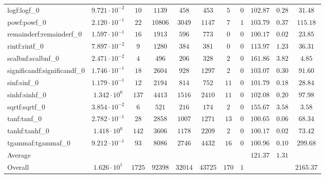 \begin{tabular}{|l|c|c|c|c|c|c|c|c|c|c|}
logf:logf\_0                 & $ 9.721 \cdot 10^{-2} $ & $ 10     $ & $ 1139  $ & $ 458   $ & $ 453   $ & $ 5   $ & $ 0 $ & $ 102.87      $ & $ 0.28    $ & $ 31.48   $ \\
powf:powf\_0                 & $ 2.120 \cdot 10^{-1} $ & $ 22     $ & $ 10806 $ & $ 3049  $ & $ 1147  $ & $ 7   $ & $ 1 $ & $ 103.79      $ & $ 0.37    $ & $ 115.18  $ \\
remainderf:remainderf\_0     & $ 1.597 \cdot 10^{-1} $ & $ 16     $ & $ 1913  $ & $ 596   $ & $ 773   $ & $ 0   $ & $ 0 $ & $ 100.17      $ & $ 0.02    $ & $ 23.85   $ \\
rintf:rintf\_0               & $ 7.897 \cdot 10^{-2} $ & $ 9      $ & $ 1280  $ & $ 384   $ & $ 381   $ & $ 0   $ & $ 0 $ & $ 113.97      $ & $ 1.23    $ & $ 36.31   $ \\
scalbnf:scalbnf\_0           & $ 2.471 \cdot 10^{-2} $ & $ 4      $ & $ 496   $ & $ 206   $ & $ 328   $ & $ 2   $ & $ 0 $ & $ 161.86      $ & $ 3.82    $ & $ 4.85    $ \\
significandf:significandf\_0 & $ 1.746 \cdot 10^{-1} $ & $ 18     $ & $ 2604  $ & $ 928   $ & $ 1297  $ & $ 2   $ & $ 0 $ & $ 103.07      $ & $ 0.30    $ & $ 91.60   $ \\
sinf:sinf\_0                 & $ 1.179 \cdot 10^{-1} $ & $ 12     $ & $ 2194  $ & $ 814   $ & $ 752   $ & $ 11  $ & $ 0 $ & $ 101.79      $ & $ 0.18    $ & $ 28.84   $ \\
sinhf:sinhf\_0               & $ 1.342 \cdot 10^{0}  $ & $ 137    $ & $ 4413  $ & $ 1516  $ & $ 2410  $ & $ 11  $ & $ 0 $ & $ 102.08      $ & $ 0.20    $ & $ 97.98   $ \\
sqrtf:sqrtf\_0               & $ 3.854 \cdot 10^{-2} $ & $ 6      $ & $ 521   $ & $ 216   $ & $ 174   $ & $ 2   $ & $ 0 $ & $ 155.67      $ & $ 3.58    $ & $ 3.58    $ \\
tanf:tanf\_0                 & $ 2.782 \cdot 10^{-1} $ & $ 28     $ & $ 2858  $ & $ 1007  $ & $ 1271  $ & $ 13  $ & $ 0 $ & $ 100.65      $ & $ 0.06    $ & $ 68.34   $ \\
tanhf:tanhf\_0               & $ 1.418 \cdot 10^{0}  $ & $ 142    $ & $ 3606  $ & $ 1178  $ & $ 2209  $ & $ 2   $ & $ 0 $ & $ 100.17      $ & $ 0.02    $ & $ 73.42   $ \\
tgammaf:tgammaf\_0           & $ 9.212 \cdot 10^{-1} $ & $ 93     $ & $ 8086  $ & $ 2746  $ & $ 4432  $ & $ 16  $ & $ 0 $ & $ 100.96      $ & $ 0.10    $ & $ 299.68  $ \\
\hline
Average                      & $                     $ & $        $ & $       $ & $       $ & $       $ & $     $ & $   $ & $ 121.37      $ & $ 1.31    $ & $         $ \\
\hline
Overall                      & $ 1.626 \cdot 10^{1}  $ & $ 1725   $ & $ 92398 $ & $ 32014 $ & $ 43725 $ & $ 170 $ & $ 1 $ & $             $ & $         $ & $ 2165.37 $ \\
\hline
\end{tabular}
